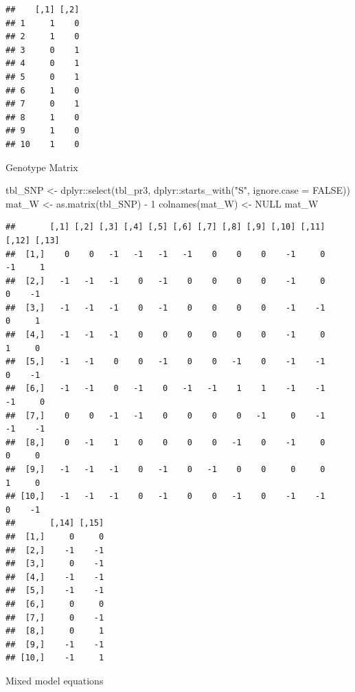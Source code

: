 \documentclass[
]{article}
\newenvironment{Shaded}{\begin{snugshade}}{\end{snugshade}}
\newcommand{\AttributeTok}[1]{\textcolor[rgb]{0.77,0.63,0.00}{#1}}
\newcommand{\ConstantTok}[1]{\textcolor[rgb]{0.00,0.00,0.00}{#1}}
\newcommand{\DecValTok}[1]{\textcolor[rgb]{0.00,0.00,0.81}{#1}}
\newcommand{\FunctionTok}[1]{\textcolor[rgb]{0.00,0.00,0.00}{#1}}
\newcommand{\NormalTok}[1]{#1}
\newcommand{\OtherTok}[1]{\textcolor[rgb]{0.56,0.35,0.01}{#1}}
\newcommand{\SpecialCharTok}[1]{\textcolor[rgb]{0.00,0.00,0.00}{#1}}
\newcommand{\StringTok}[1]{\textcolor[rgb]{0.31,0.60,0.02}{#1}}
\begin{document}
\begin{verbatim}
##    [,1] [,2]
## 1     1    0
## 2     1    0
## 3     0    1
## 4     0    1
## 5     0    1
## 6     1    0
## 7     0    1
## 8     1    0
## 9     1    0
## 10    1    0
\end{verbatim}

Genotype Matrix

\begin{Shaded}
\begin{Highlighting}[]
\NormalTok{tbl\_SNP }\OtherTok{\textless{}{-}}\NormalTok{ dplyr}\SpecialCharTok{::}\FunctionTok{select}\NormalTok{(tbl\_pr3, dplyr}\SpecialCharTok{::}\FunctionTok{starts\_with}\NormalTok{(}\StringTok{"S"}\NormalTok{, }\AttributeTok{ignore.case =} \ConstantTok{FALSE}\NormalTok{))}
\NormalTok{mat\_W }\OtherTok{\textless{}{-}} \FunctionTok{as.matrix}\NormalTok{(tbl\_SNP) }\SpecialCharTok{{-}} \DecValTok{1}
\FunctionTok{colnames}\NormalTok{(mat\_W) }\OtherTok{\textless{}{-}} \ConstantTok{NULL}
\NormalTok{mat\_W}
\end{Highlighting}
\end{Shaded}

\begin{verbatim}
##       [,1] [,2] [,3] [,4] [,5] [,6] [,7] [,8] [,9] [,10] [,11] [,12] [,13]
##  [1,]    0    0   -1   -1   -1   -1    0    0    0    -1     0    -1     1
##  [2,]   -1   -1   -1    0   -1    0    0    0    0    -1     0     0    -1
##  [3,]   -1   -1   -1    0   -1    0    0    0    0    -1    -1     0     1
##  [4,]   -1   -1   -1    0    0    0    0    0    0    -1     0     1     0
##  [5,]   -1   -1    0    0   -1    0    0   -1    0    -1    -1     0    -1
##  [6,]   -1   -1    0   -1    0   -1   -1    1    1    -1    -1    -1     0
##  [7,]    0    0   -1   -1    0    0    0    0   -1     0    -1    -1    -1
##  [8,]    0   -1    1    0    0    0    0   -1    0    -1     0     0     0
##  [9,]   -1   -1   -1    0   -1    0   -1    0    0     0     0     1     0
## [10,]   -1   -1   -1    0   -1    0    0   -1    0    -1    -1     0    -1
##       [,14] [,15]
##  [1,]     0     0
##  [2,]    -1    -1
##  [3,]     0    -1
##  [4,]    -1    -1
##  [5,]    -1    -1
##  [6,]     0     0
##  [7,]     0    -1
##  [8,]     0     1
##  [9,]    -1    -1
## [10,]    -1     1
\end{verbatim}

Mixed model equations
\end{document}
